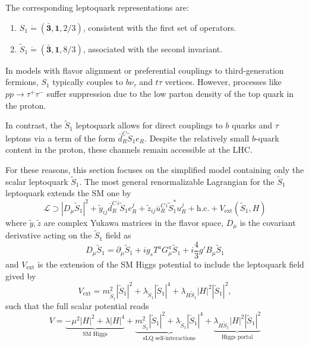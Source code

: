 The corresponding leptoquark representations are:
\begin{enumerate}
    \item $S_1 \dot= (\bar{\mathbf{3}}, \mathbf{1}, 2/3)$, consistent with the first set of operators.
    \item $\tilde{S}_1 \dot= (\bar{\mathbf{3}}, \mathbf{1}, 8/3)$, associated with the second invariant.
\end{enumerate}

In models with flavor alignment or preferential couplings to third-generation fermions, $S_1$ typically couples to $b\nu_\tau$ and $t\tau$ vertices. However, processes like $pp \to \tau^+\tau^-$ suffer suppression due to the low parton density of the top quark in the proton. 

In contrast, the $\tilde{S}_1$ leptoquark allows for direct couplings to $b$ quarks and $\tau$ leptons via a term of the form $\overline{d}_R^C \tilde{S}_1 e_R$. Despite the relatively small $b$-quark content in the proton, these channels remain accessible at the LHC.

For these reasons, this section focuses on the simplified model containing only the scalar leptoquark $\tilde{S}_1$. The most general renormalizable Lagrangian for the $\tilde{S}_1$ leptoquark extends the SM one by
\begin{equation}
    \mathcal{L}\supset |D_\mu\tilde{S}_1|^2 + \tilde{y}_{ij} \overline{d}_R^{C\,i} \tilde{S}_1 e_R^j + \tilde{z}_{ij} \overline{u}_R^{C\,i} \tilde{S}_1^* u_R^j + \text{h.c.} + V_{\text{ext}}(\tilde{S}_1,H)
\end{equation}
where $\tilde{y}, \tilde{z}$ are complex Yukawa matrices in the flavor space, $D_\mu$ is the covariant derivative acting on the $\tilde{S}_1$ field as 
\begin{equation}
    D_\mu \tilde{S}_1 = \partial_\mu \tilde{S}_1 + i g_s T^a G_\mu^a \tilde{S}_1 + i \frac{4}{3} g' B_\mu \tilde{S}_1
\end{equation}
and $V_{\text{ext}}$ is the extension of the SM Higgs potential to include the leptoquark field gived by
\begin{equation}
    V_{\text{ext}} = m_{\tilde{S}_1}^2 |\tilde{S}_1|^2 + \lambda_{\tilde{S}_1} |\tilde{S}_1|^4 + \lambda_{H\tilde{S}_1} |H|^2 |\tilde{S}_1|^2,
\end{equation}
such that the full scalar potential reads
\begin{equation}
    V = \underbrace{-\mu^2|H|^2 + \lambda|H|^4}_{\text{SM Higgs}} + \underbrace{m_{\tilde{S}_1}^2|\tilde{S}_1|^2 + \lambda_{\tilde{S}_1}|\tilde{S}_1|^4}_{\text{sLQ self-interactions}} + \underbrace{\lambda_{H\tilde{S}_1}|H|^2|\tilde{S}_1|^2}_{\text{Higgs portal}}
\end{equation}

